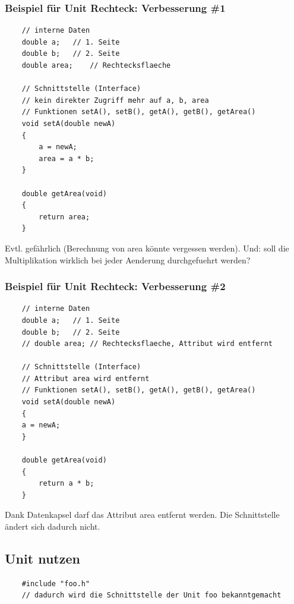 \subsubsection{Beispiel für Unit Rechteck: Verbesserung \#1}
\label{sec:Beispiel fuer Unit Rechteck: Verbesserung 1}
\noindent
\begin{minipage}{\linewidth}
	\begin{lstlisting}
	// interne Daten
	double a;	// 1. Seite
	double b;	// 2. Seite
	double area;	// Rechtecksflaeche
	
	// Schnittstelle (Interface)
	// kein direkter Zugriff mehr auf a, b, area
	// Funktionen setA(), setB(), getA(), getB(), getArea()
	void setA(double newA)
	{
		a = newA;
		area = a * b;
	}
	
	double getArea(void)
	{
		return area;
	}
	\end{lstlisting}
\end{minipage}
\begin{hinweis}
	Evtl. gefährlich (Berechnung von area könnte vergessen werden). Und: soll die Multiplikation wirklich bei jeder Aenderung durchgefuehrt werden?
\end{hinweis}

\subsubsection{Beispiel für Unit Rechteck: Verbesserung \#2}
\label{sec:Beispiel fuer Unit Rechteck: Verbesserung 2}
\noindent
\begin{minipage}{\linewidth}
	\begin{lstlisting}
	// interne Daten
	double a;	// 1. Seite
	double b;	// 2. Seite
	// double area;	// Rechtecksflaeche, Attribut wird entfernt
	
	// Schnittstelle (Interface)
	// Attribut area wird entfernt
	// Funktionen setA(), setB(), getA(), getB(), getArea()
	void setA(double newA)
	{
	a = newA;
	}
	
	double getArea(void)
	{
		return a * b;
	}
	\end{lstlisting}
\end{minipage}
\begin{hinweis}
	Dank Datenkapsel darf das Attribut area entfernt werden. Die Schnittstelle ändert sich dadurch nicht.
\end{hinweis}

\subsection{Unit nutzen}
\label{sec:Unit nutzen}
\noindent
\begin{minipage}{\linewidth}
	\begin{lstlisting}
	#include "foo.h"
	// dadurch wird die Schnittstelle der Unit foo bekanntgemacht
	\end{lstlisting}
\end{minipage}

